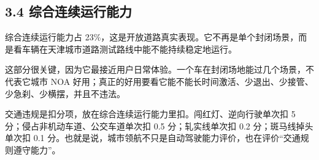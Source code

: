\subsection{3.4 综合连续运行能力}

综合连续运行能力占 23\%，这是开放道路真实表现。它不再是单个封闭场景，而是看车辆在天津城市道路测试路线中能不能持续稳定地运行。

这部分很关键，因为它最接近用户日常体验。一个车在封闭场地能过几个场景，不代表它城市 NOA 好用；真正的好用要看它能不能长时间激活、少退出、少接管、少急刹、少横摆，并且不违法。

交通违规是扣分项，放在综合连续运行能力里扣。闯红灯、逆向行驶单次扣 5 分；侵占非机动车道、公交车道单次扣 0.5 分；轧实线单次扣 0.2 分；斑马线掉头单次扣 0.1 分。也就是说，城市领航不只是自动驾驶能力评价，也在评价“交通规则遵守能力”。
